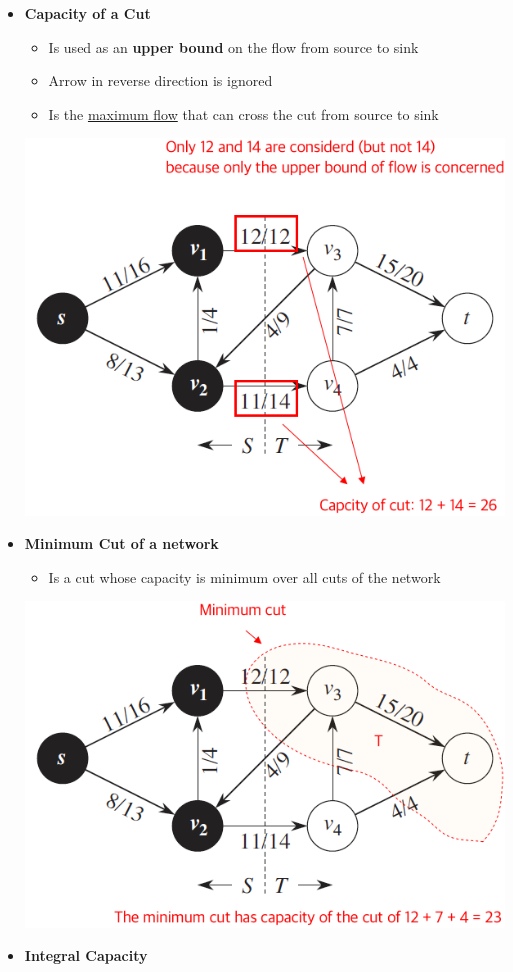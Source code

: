 \documentclass[12pt]{article}
\begin{document}
\begin{enumerate}[1.]
\begin{itemize}
        \item \textbf{Capacity of a Cut}
        \begin{itemize}
            \item Is used as an \textbf{upper bound} on the flow from source to sink
            \item Arrow in reverse direction is ignored
            \item Is the \underline{maximum flow} that can cross the cut from source to sink
        \end{itemize}

        \bigskip

        \begin{center}
        \includegraphics[width=0.5\linewidth]{images/worksheet_5_solution_24.png}
        \end{center}

        \item \textbf{Minimum Cut of a network}

        \begin{itemize}
            \item Is a cut whose capacity is minimum over all cuts of the network
        \end{itemize}


        \begin{center}
        \includegraphics[width=0.5\linewidth]{images/worksheet_5_solution_25.png}
        \end{center}

        \item \textbf{Integral Capacity}


\end{itemize}
\end{enumerate}
\end{document}
